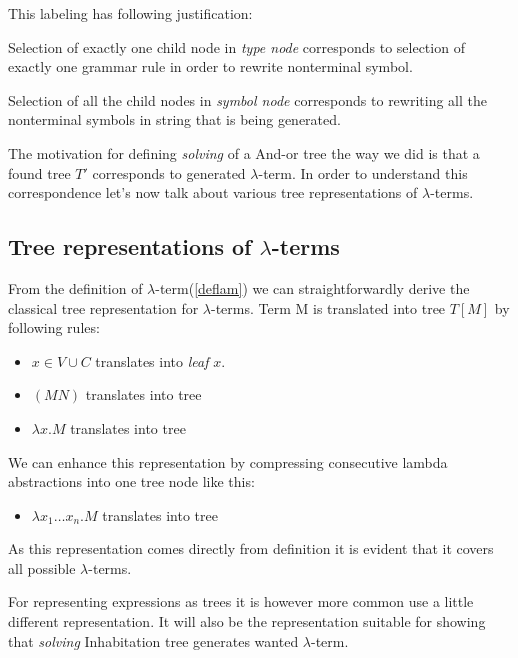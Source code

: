\documentclass[12pt,a4paper]{report}
\newcommand{\lterm}{$\lambda$-term\xspace}
\newcommand{\lterms}{$\lambda$-terms\xspace}
\begin{document}
This labeling has following justification: 

Selection of exactly one
child node in \textit{type node} corresponds to selection of exactly one
grammar rule in order to rewrite nonterminal symbol.  

Selection of all the child nodes in \textit{symbol node} corresponds to 
rewriting all the nonterminal symbols in string that is being generated.  

The motivation for defining \textit{solving} of a And-or tree the way we did is that
a found tree $T'$ corresponds to generated \lterm. 
In order to understand this correspondence let's now talk about various tree representations
of \lterms.

\subsection{Tree representations of \lterms}

From the definition of \lterm (\ref{deflam}) we can straightforwardly derive 
the classical tree representation for \lterms. Term M is translated into tree $T[M]$ by following rules:

\begin{itemize}
	\item $x \in V \cup C$ translates into \textit{leaf} $x$.
	\item $(M N)$ translates into tree\\
	\item $\lambda x . M$ translates into tree\\
\end{itemize}

We can enhance this representation by compressing consecutive lambda abstractions into one
tree node like this: 

\begin{itemize}
	\item $\lambda x_1 \dots x_n . M$ translates into tree\\
\end{itemize}

As this representation comes directly from definition it is evident 
that it covers all possible \lterms.

For representing expressions as trees it is however more common use a little different
representation. It will also be the representation suitable for showing 
that \textit{solving} Inhabitation tree generates wanted \lterm.
\end{document}
